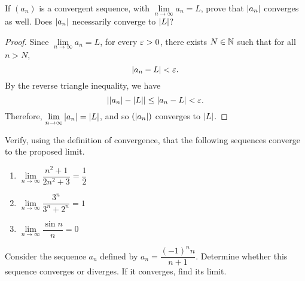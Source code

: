 \begin{problem}
  If $(a_{n})$ is a convergent sequence, with $\lim\limits_{n \to \infty} a_{n} = L$, prove that
  $\left\lvert a_{n} \right\rvert$ converges as well. Does $\left\lvert a_{n} \right\rvert$ necessarily converge to $\left\lvert L \right\rvert$?

  \begin{proof}
    Since $\lim\limits_{n \to \infty} a_n = L$, for every $\varepsilon > 0$, there exists $N \in \mathbb{N}$ such that for all $n > N$,
    \[
      \left\lvert a_{n} - L \right\rvert < \varepsilon.
    \]
    By the reverse triangle inequality, we have
    \[
    \left\lvert \left\lvert a_{n} \right\rvert - \left\lvert L \right\rvert \right\rvert \leq \left\lvert a_{n} - L \right\rvert < \varepsilon.
    \]
    Therefore, $\lim\limits_{n \to \infty} \left\lvert a_{n} \right\rvert = \left\lvert L \right\rvert$, and so $(\left\lvert a_{n} \right\rvert)$ converges to $\left\lvert L \right\rvert$\footnotemark.
  \end{proof}
\end{problem}

\begin{problem}
  Verify, using the definition of convergence, that the following sequences converge to the proposed limit.

  \begin{enumerate}[label=(\alph*)]
    \item $\lim\limits_{n \to \infty} \dfrac{n^{2} + 1}{2n^{2} + 3} = \dfrac{1}{2}$
    \item $\lim\limits_{n \to \infty} \dfrac{3^{n}}{3^{n} + 2^{n}} = 1$
    \item $\lim\limits_{n \to \infty} \dfrac{\sin n}{n} = 0$
  \end{enumerate}

\end{problem}

\begin{problem}
  Consider the sequence $a_{n}$ defined by $a_{n} = \dfrac{(-1)^{n} n}{n + 1}$.
  Determine whether this sequence converges or diverges. If it converges, find
  its limit.
\end{problem}
